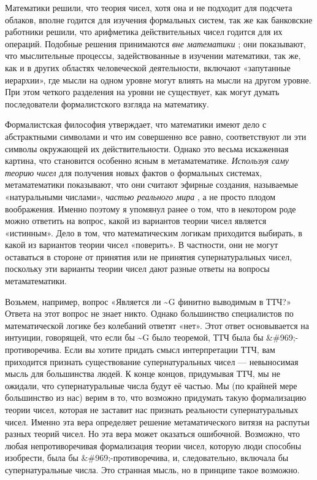 \documentclass[../main.tex]{subfiles}
\begin{document}
Математики решили, что теория чисел, хотя она и не подходит для подсчета облаков, вполне годится для изучения формальных систем, так же как банковские работники решили, что арифметика действительных чисел годится для их операций. Подобные решения принимаются \emph{вне математики} ; они показывают, что мыслительные процессы, задействованные в изучении математики, так же, как и в других областях человеческой деятельности, включают «запутанные иерархии», где мысли на одном уровне могут влиять на мысли на другом уровне. При этом четкого разделения на уровни не существует, как могут думать последователи формалистского взгляда на математику.

Формалистская философия утверждает, что математики имеют дело с абстрактными символами и что им совершенно все равно, соответствуют ли эти символы окружающей их действительности. Однако это весьма искаженная картина, что становится особенно ясным в метаматематике. \emph{Используя саму теорию чисел} для получения новых фактов о формальных системах, метаматематики показывают, что они считают эфирные создания, называемые «натуральными числами», \emph{частью реального мира} , а не просто плодом воображения. Именно поэтому я упомянул ранее о том, что в некотором роде можно ответить на вопрос, какой из вариантов теории чисел является «истинным». Дело в том, что математическим логикам приходится выбирать, в какой из вариантов теории чисел «поверить». В частности, они не могут оставаться в стороне от принятия или не принятия супернатуральных чисел, поскольку эти варианты теории чисел дают разные ответы на вопросы метаматематики.

Возьмем, например, вопрос «Является ли \textasciitilde G финитно выводимым в ТТЧ?» Ответа на этот вопрос не знает никто. Однако большинство специалистов по математической логике без колебаний ответят «нет». Этот ответ основывается на интуиции, говорящей, что если бы \textasciitilde G было теоремой, ТТЧ была бы \&\#969;-противоречива. Если вы хотите придать смысл интерпретации ТТЧ, вам приходится признать существование супернатуральных чисел --- невыносимая мысль для большинства людей. К конце концов, придумывая ТТЧ, мы не ожидали, что супернатуральные числа будут её частью. Мы (по крайней мере большинство из нас) верим в то, что возможно придумать такую формализацию теории чисел, которая не заставит нас признать реальности супернатуральных чисел. Именно эта вера определяет решение метаматического витязя на распутьи разных теорий чисел. Но эта вера может оказаться ошибочной. Возможно, что любая непротиворечивая формализация теории чисел, которую люди способны изобрести, была бы \&\#969;-противоречива, и, следовательно, включала бы супернатуральные числа. Это странная мысль, но в принципе такое возможно.
\end{document}
